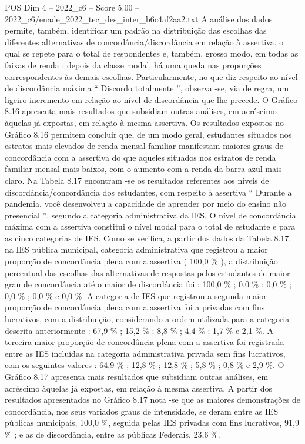 \begin{textsample}{POS Dim 4 – 2022\_c6 – Score 5.00 – 2022\_c6/enade\_2022\_tec\_des\_inter\_b6c4af2aa2.txt}
A análise dos dados permite, também, identificar um padrão na distribuição das escolhas das diferentes alternativas de concordância/discordância em relação à assertiva, o qual se repete para o total de respondentes e, também, grosso modo, em todas as faixas de renda : depois da classe modal, há uma queda nas proporções correspondentes às demais escolhas.
Particularmente, no que diz respeito ao nível de discordância máxima “ Discordo totalmente ”, observa -se, via de regra, um ligeiro incremento em relação ao nível de discordância que lhe precede.
O Gráfico 8.16 apresenta mais resultados que subsidiam outras análises, em acréscimo àquelas já expostas, em relação à mesma assertiva.
Os resultados expostos no Gráfico 8.16 permitem concluir que, de um modo geral, estudantes situados nos estratos mais elevados de renda mensal familiar manifestam maiores graus de concordância com a assertiva do que aqueles situados nos estratos de renda familiar mensal mais baixos, com o aumento com a renda da barra azul mais claro.
Na Tabela 8.17 encontram -se os resultados referentes aos níveis de discordância/concordância dos estudantes, com respeito à assertiva “ Durante a pandemia, você desenvolveu a capacidade de aprender por meio do ensino não presencial ”, segundo a categoria administrativa da IES.
O nível de concordância máxima com a assertiva constitui o nível modal para o total de estudante e para as cinco categorias de IES.
Como se verifica, a partir dos dados da Tabela 8.17, na IES pública municipal, categoria administrativa que registrou a maior proporção de concordância plena com a assertiva ( 100,0 \% ), a distribuição percentual das escolhas das alternativas de respostas pelos estudantes de maior grau de concordância até o maior de discordância foi : 100,0 \% ; 0,0 \% ; 0,0 \% ; 0,0 \% ; 0,0 \% e 0,0 \%.
A categoria de IES que registrou a segunda maior proporção de concordância plena com a assertiva foi a privadas com fins lucrativos, com a distribuição, considerando a ordem utilizada para a categoria descrita anteriormente : 67,9 \% ; 15,2 \% ; 8,8 \% ; 4,4 \% ; 1,7 \% e 2,1 \%.
A terceira maior proporção de concordância plena com a assertiva foi registrada entre as IES incluídas na categoria administrativa privada sem fins lucrativos, com os seguintes valores : 64,9 \% ; 12,8 \% ; 12,8 \% ; 5,8 \% ; 0,8 \% e 2,9 \%.
O Gráfico 8.17 apresenta mais resultados que subsidiam outras análises, em acréscimo àquelas já expostas, em relação à mesma assertiva.
A partir dos resultados apresentados no Gráfico 8.17 nota -se que as maiores demonstrações de concordância, nos seus variados graus de intensidade, se deram entre as IES públicas municipais, 100,0 \%, seguida pelas IES privadas com fins lucrativos, 91,9 \% ; e as de discordância, entre as públicas Federais, 23,6 \%.

\end{textsample}
